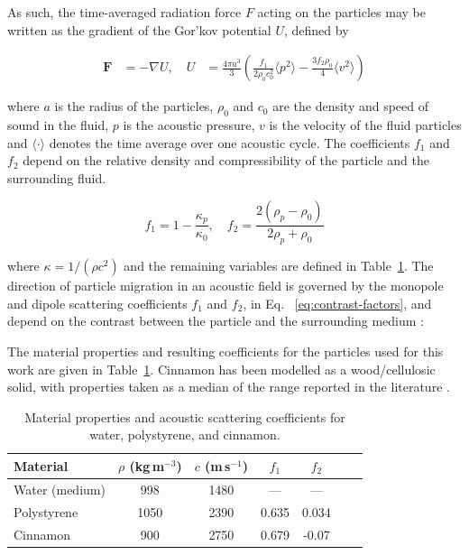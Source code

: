 \documentclass[11pt,a4paper]{article}
\begin{document}
As such, the time-averaged radiation force $F$ acting on the particles may be written as the gradient of the Gor'kov potential $U$, defined by


\begin{equation}
    \begin{aligned}
    \mathbf{F} &= - \nabla U,\quad
    U &=
    \frac{4 \pi a^3}{3}
    \left(
    \frac{f_1}{2 \rho_0 c_0^2}
    \langle p^2 \rangle
    -
    \frac{3 f_2 \rho_0}{4}
    \langle v^2 \rangle
    \right)
    \end{aligned}
    \label{eq:gorkov}
\end{equation}

\noindent where $a$ is the radius of the particles, $\rho_0$ and $c_0$ are the density and speed of sound in the fluid, 
$p$ is the acoustic pressure, $v$ is the velocity of the fluid particles and 
$\langle\cdot\rangle$ denotes the time average over one acoustic cycle. The coefficients $f_1$ and $f_2$ depend on the relative density and compressibility of the particle and the surrounding fluid. 

\begin{equation}
f_1 = 1 - \frac{\kappa_p}{\kappa_0}, \quad
f_2 = \frac{2(\rho_p - \rho_0)}{2\rho_p + \rho_0}
\label{eq:contrast-factors}
\end{equation}


\noindent where $\kappa = 1/(\rho c^2)$ and the remaining variables are defined in Table~\ref{tab:contrast}. The direction of particle migration in an acoustic field is governed by the monopole and dipole scattering coefficients $f_1$ and $f_2$, in Eq. ~\ref{eq:contrast-factors}, and depend on the contrast between the particle and the surrounding medium 
\cite{gorkov1962}:


The material properties and resulting coefficients for the particles used for this work are given in Table~\ref{tab:contrast}. Cinnamon has been modelled as a wood/cellulosic solid, with properties taken as a median of the range reported in the literature \cite{acousticMaterials2025}\cite{kinsler2000fundamentals}.

\begin{table}[h]
\centering
\begin{tabular}{lcccccc}
Material & $\rho$ (kg\,m$^{-3}$) & $c$ (m\,s$^{-1}$) & $f_1$ & $f_2$ \\
\hline
Water (medium) & 998  & 1480 & ---   & ---    \\
Polystyrene    & 1050 & 2390 & 0.635 & 0.034  \\
Cinnamon       & 900  & 2750 & 0.679 & -0.07 \\
\end{tabular}
\caption{Material properties and acoustic scattering coefficients for 
         water, polystyrene, and cinnamon.}
\label{tab:contrast}
\end{table}
\end{document}
